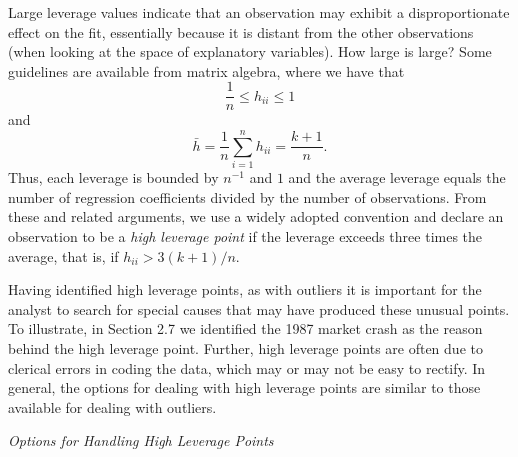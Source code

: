Large leverage values indicate that an observation may exhibit a
disproportionate effect on the fit, essentially because it is
distant from the other observations (when looking at the space of
explanatory variables). How large is large? Some guidelines are
available from matrix algebra, where we have that
\begin{equation*}
\frac{1}{n}\leq h_{ii}\leq 1
\end{equation*}
and
\begin{equation*}
\bar{h}=\frac{1}{n}\sum_{i=1}^{n}h_{ii}=\frac{k+1}{n}.
\end{equation*}
Thus, each leverage is bounded by $n^{-1}$ and $1$ and the average
leverage equals the number of regression coefficients divided by the
number of observations. From these and related arguments, we use a
widely adopted convention and declare an observation to be a
\textit{high leverage point} if the leverage exceeds three times the
average, that is, if $h_{ii}>3(k+1)/n $.



Having identified high leverage points, as with outliers it is
important for the analyst to search for special causes that may have
produced these unusual points. To illustrate, in Section 2.7 we
identified the 1987 market crash as the reason behind the high
leverage point. Further, high leverage points are often due to
clerical errors in coding the data, which may or may not be easy to
rectify. In general, the options for dealing with high leverage
points are similar to those available for dealing with outliers.
\bigskip

\boxedjed

\emph{Options for Handling High Leverage Points}

